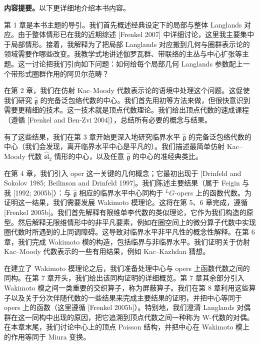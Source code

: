 
\noindent\textbf{内容提要。}以下更详细地介绍本书内容。

第 1 章是本书主题的导引。我们首先概述经典设定下的局部与整体 Langlands 对应。由于整体情形已在我的近期综述 [Frenkel 2007] 中详细讨论，这里我主要集中于局部情形。接着，我解释为了把局部 Langlands 对应搬到几何与圈群表示论的领域需要作哪些改变。我教学式地讲述伽罗瓦群、带联络的主丛与中心扩张等主题。这一讨论把我们引向如下问题：如何给每个局部几何 Langlands 参数配上一个带形式圈群作用的阿贝尔范畴？

在第 2 章，我们在仿射 Kac--Moody 代数表示论的语境中处理这个问题。这促使我们研究 $\hat{\mathfrak{g}}$ 的完备泛包络代数的中心。我们首先用初等方法来做，但很快意识到需要更精细的技术。这一技术就是顶点代数理论。我们给出顶点代数的速成课程（遵循 [Frenkel and Ben-Zvi 2004]），总结所有必要的概念与结果。

有了这些结果，我们在第 3 章开始更深入地研究临界水平 $\hat{\mathfrak{g}}$ 的完备泛包络代数的中心（我们会发现，离开临界水平中心是平凡的）。我们描述最简单仿射 Kac--Moody 代数 $\hat{\mathfrak{sl}}_2$ 情形的中心，以及任意 $\hat{\mathfrak{g}}$ 的中心的准经典类比。

在第 4 章，我们引入 oper 这一关键的几何概念；它最初出现于 [Drinfeld and Sokolov 1985; Beilinson and Drinfeld 1997]。我们陈述主要结果（属于 Feigin 与我 [1992; 2005b]）：与 $\hat{\mathfrak{g}}$ 相应的临界水平中心同构于 ${}^L G$-opers 上的函数代数。为证明这一结果，我们需要发展 Wakimoto 模理论。这将在第 5、6 章完成，遵循 [Frenkel 2005b]。我们首先解释有限维单李代数的类似理论，它作为我们构造的原型。然后解释无限维情形中的非平凡要素，例如在圈空间上的微分算子代数中实现圈代数时所遇到的上同调障碍。这导致对临界水平非平凡性的概念性解释。在第 6 章，我们完成 Wakimoto 模的构造，包括临界与非临界水平。我们证明关于仿射 Kac--Moody 代数表示的一些有用结果，例如 Kac--Kazhdan 猜想。

在建立了 Wakimoto 模理论之后，我们准备处理中心与 opers 上函数代数之间的同构。在第 7 章开头，我们给出该同构证明的详细概览。第 7 章其余部分引入 Wakimoto 模之间一类重要的交织算子，称为屏蔽算子。我们在第 8 章利用这些算子以及关于分次伴随代数的一些结果来完成主要结果的证明，并把中心等同于 opers 上的函数（这里遵循 [Frenkel 2005b]）。特别地，我们澄清 Langlands 对偶群在这一同构中出现的原因，把它追溯到顶点代数之间一种称为 W-代数的对偶。在本章末尾，我们讨论中心上的顶点 Poisson 结构，并把中心在 Wakimoto 模上的作用等同于 Miura 变换。


